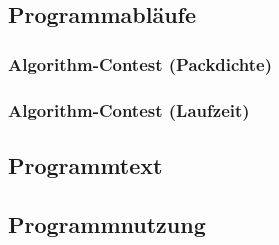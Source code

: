\subsection{Programmabläufe}
\subsubsection{Algorithm-Contest (Packdichte)}
\label{algcont}
\subsubsection{Algorithm-Contest (Laufzeit)}
\subsection{Programmtext}
\subsection{Programmnutzung}